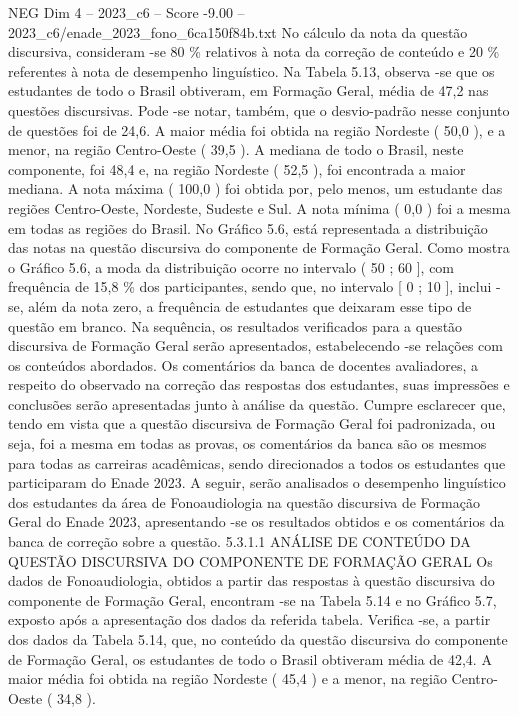 \begin{textsample}{NEG Dim 4 – 2023\_c6 – Score -9.00 – 2023\_c6/enade\_2023\_fono\_6ca150f84b.txt}
No cálculo da nota da questão discursiva, consideram -se 80 \% relativos à nota da correção de conteúdo e 20 \% referentes à nota de desempenho linguístico.
Na Tabela 5.13, observa -se que os estudantes de todo o Brasil obtiveram, em Formação Geral, média de 47,2 nas questões discursivas.
Pode -se notar, também, que o desvio-padrão nesse conjunto de questões foi de 24,6.
A maior média foi obtida na região Nordeste ( 50,0 ), e a menor, na região Centro-Oeste ( 39,5 ).
A mediana de todo o Brasil, neste componente, foi 48,4 e, na região Nordeste ( 52,5 ), foi encontrada a maior mediana.
A nota máxima ( 100,0 ) foi obtida por, pelo menos, um estudante das regiões Centro-Oeste, Nordeste, Sudeste e Sul.
A nota mínima ( 0,0 ) foi a mesma em todas as regiões do Brasil.
No Gráfico 5.6, está representada a distribuição das notas na questão discursiva do componente de Formação Geral.
Como mostra o Gráfico 5.6, a moda da distribuição ocorre no intervalo ( 50 ; 60 ], com frequência de 15,8 \% dos participantes, sendo que, no intervalo [ 0 ; 10 ], inclui -se, além da nota zero, a frequência de estudantes que deixaram esse tipo de questão em branco.
Na sequência, os resultados verificados para a questão discursiva de Formação Geral serão apresentados, estabelecendo -se relações com os conteúdos abordados.
Os comentários da banca de docentes avaliadores, a respeito do observado na correção das respostas dos estudantes, suas impressões e conclusões serão apresentadas junto à análise da questão.
Cumpre esclarecer que, tendo em vista que a questão discursiva de Formação Geral foi padronizada, ou seja, foi a mesma em todas as provas, os comentários da banca são os mesmos para todas as carreiras acadêmicas, sendo direcionados a todos os estudantes que participaram do Enade 2023.
A seguir, serão analisados o desempenho linguístico dos estudantes da área de Fonoaudiologia na questão discursiva de Formação Geral do Enade 2023, apresentando -se os resultados obtidos e os comentários da banca de correção sobre a questão. 5.3.1.1 ANÁLISE DE CONTEÚDO DA QUESTÃO DISCURSIVA DO COMPONENTE DE FORMAÇÃO GERAL Os dados de Fonoaudiologia, obtidos a partir das respostas à questão discursiva do componente de Formação Geral, encontram -se na Tabela 5.14 e no Gráfico 5.7, exposto após a apresentação dos dados da referida tabela.
Verifica -se, a partir dos dados da Tabela 5.14, que, no conteúdo da questão discursiva do componente de Formação Geral, os estudantes de todo o Brasil obtiveram média de 42,4.
A maior média foi obtida na região Nordeste ( 45,4 ) e a menor, na região Centro-Oeste ( 34,8 ).

\end{textsample}
